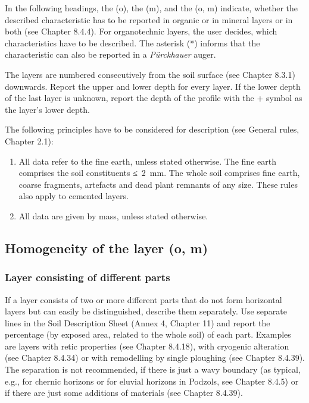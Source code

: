\documentclass[
  letterpaper,
  DIV=11,
  numbers=noendperiod]{scrreprt}
\providecommand{\tightlist}{%
  \setlength{\itemsep}{0pt}\setlength{\parskip}{0pt}}\usepackage{longtable,booktabs,array}
\begin{document}
In the following headings, the (o), the (m), and the (o, m) indicate,
whether the described characteristic has to be reported in organic or in
mineral layers or in both (see Chapter 8.4.4). For organotechnic layers,
the user decides, which characteristics have to be described. The
asterisk (*) informs that the characteristic can also be reported in a
\emph{Pürckhauer} auger.

The layers are numbered consecutively from the soil surface (see Chapter
8.3.1) downwards. Report the upper and lower depth for every layer. If
the lower depth of the last layer is unknown, report the depth of the
profile with the + symbol as the layer's lower depth.

The following principles have to be considered for description (see
General rules, Chapter 2.1):

\begin{enumerate}
\def\labelenumi{\arabic{enumi}.}
\tightlist
\item
  All data refer to the fine earth, unless stated otherwise. The fine
  earth comprises the soil constituents ≤~2~mm. The whole soil comprises
  fine earth, coarse fragments, artefacts and dead plant remnants of any
  size. These rules also apply to cemented layers.
\item
  All data are given by mass, unless stated otherwise.
\end{enumerate}

\hypertarget{homogeneity-of-the-layer-o-m}{%
\subsection{Homogeneity of the layer (o,
m)}\label{homogeneity-of-the-layer-o-m}}

\hypertarget{layer-consisting-of-different-parts}{%
\subsubsection{Layer consisting of different
parts}\label{layer-consisting-of-different-parts}}

If a layer consists of two or more different parts that do not form
horizontal layers but can easily be distinguished, describe them
separately. Use separate lines in the Soil Description Sheet (Annex 4,
Chapter 11) and report the percentage (by exposed area, related to the
whole soil) of each part. Examples are layers with retic properties (see
Chapter 8.4.18), with cryogenic alteration (see Chapter 8.4.34) or with
remodelling by single ploughing (see Chapter 8.4.39). The separation is
not recommended, if there is just a wavy boundary (as typical, e.g., for
chernic horizons or for eluvial horizons in Podzols, see Chapter 8.4.5)
or if there are just some additions of materials (see Chapter 8.4.39).
\end{document}
